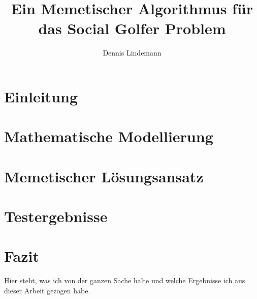 \documentclass[draft]{tcs-seminar}
\begin{document}
\title{Ein Memetischer Algorithmus für das Social Golfer Problem}
\author{Dennis Lindemann}

\begin{abstract}

\end{abstract}

\maketitle


\section{Einleitung}
  


\section{Mathematische Modellierung}
    


\section{Memetischer Lösungsansatz}
  

\section{Testergebnisse}
  


\section{Fazit}
Hier steht, was ich von der ganzen Sache halte und welche Ergebnisse ich aus dieser Arbeit gezogen habe.

\begin{thebibliography}{9}  
    
\end{thebibliography}
\end{document}
